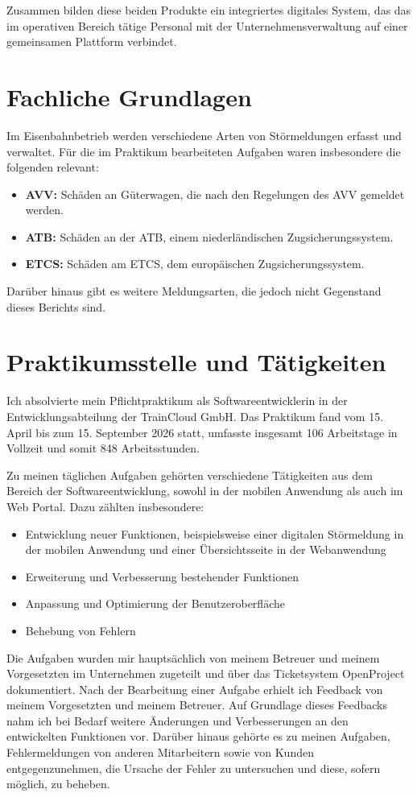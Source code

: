 Zusammen bilden diese beiden Produkte ein integriertes digitales System, das das im operativen Bereich tätige Personal mit der Unternehmensverwaltung
auf einer gemeinsamen Plattform verbindet.

\section{Fachliche Grundlagen}
Im Eisenbahnbetrieb werden verschiedene Arten von Störmeldungen erfasst und verwaltet.
Für die im Praktikum bearbeiteten Aufgaben waren insbesondere die folgenden relevant:
\begin{itemize}
    \item \textbf{\ac{AVV}:} Schäden an Güterwagen, die nach den Regelungen des \ac{AVV} gemeldet werden.
    \item \textbf{\ac{ATB}:} Schäden an der \ac{ATB}, einem niederländischen Zugsicherungssystem.
    \item \textbf{\ac{ETCS}:} Schäden am \ac{ETCS}, dem europäischen Zugsicherungssystem.
\end{itemize}
Darüber hinaus gibt es weitere Meldungsarten, die jedoch nicht Gegenstand dieses Berichts sind.

\section{Praktikumsstelle und Tätigkeiten}
Ich absolvierte mein Pflichtpraktikum als Softwareentwicklerin in der Entwicklungsabteilung der TrainCloud GmbH.
Das Praktikum fand vom 15. April bis zum 15. September 2026 statt, umfasste insgesamt 106 Arbeitstage in Vollzeit und somit 848 Arbeitsstunden. 

Zu meinen täglichen Aufgaben gehörten verschiedene Tätigkeiten aus dem Bereich der Softwareentwicklung, 
sowohl in der mobilen Anwendung als auch im Web Portal. Dazu zählten insbesondere:
\begin{itemize}
    \item Entwicklung neuer Funktionen, beispielsweise einer digitalen Störmeldung in der mobilen Anwendung 
    und einer Übersichtsseite in der Webanwendung
    \item Erweiterung und Verbesserung bestehender Funktionen
    \item Anpassung und Optimierung der Benutzeroberfläche
    \item Behebung von Fehlern
\end{itemize}

Die Aufgaben wurden mir hauptsächlich von meinem Betreuer und meinem Vorgesetzten im Unternehmen zugeteilt und über das Ticketsystem OpenProject dokumentiert.
Nach der Bearbeitung einer Aufgabe erhielt ich Feedback von meinem Vorgesetzten und meinem Betreuer. Auf Grundlage dieses Feedbacks nahm ich bei Bedarf
weitere Änderungen und Verbesserungen an den entwickelten Funktionen vor. Darüber hinaus gehörte es zu meinen Aufgaben, Fehlermeldungen von anderen Mitarbeitern
sowie von Kunden entgegenzunehmen, die Ursache der Fehler zu untersuchen und diese, sofern möglich, zu beheben. 

